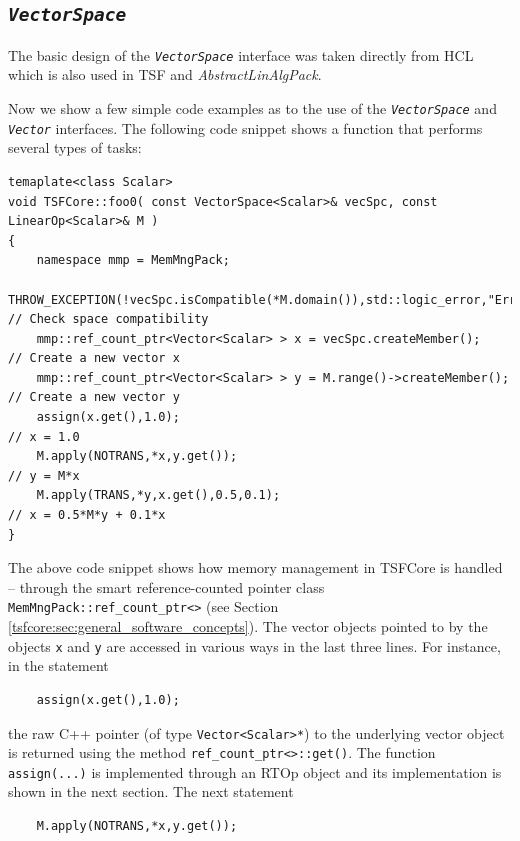 %
\subsection{\texttt{\textit{VectorSpace}}}
\label{tsfcore:sec:vec_space}
%

The basic design of the \texttt{\textit{VectorSpace}} interface was
taken directly from HCL which is also used in TSF and
\textit{AbstractLinAlgPack}.

Now we show a few simple code examples as to the use of the
\texttt{\textit{VectorSpace}} and
\texttt{\textit{Vector}} interfaces.  The following code snippet shows
a function that performs several types of tasks:

{\tiny\begin{verbatim}
temaplate<class Scalar>
void TSFCore::foo0( const VectorSpace<Scalar>& vecSpc, const LinearOp<Scalar>& M )
{
    namespace mmp = MemMngPack;
    THROW_EXCEPTION(!vecSpc.isCompatible(*M.domain()),std::logic_error,"Error!"); // Check space compatibility
    mmp::ref_count_ptr<Vector<Scalar> > x = vecSpc.createMember();                // Create a new vector x
    mmp::ref_count_ptr<Vector<Scalar> > y = M.range()->createMember();            // Create a new vector y
    assign(x.get(),1.0);                                                          // x = 1.0
    M.apply(NOTRANS,*x,y.get());                                                  // y = M*x
    M.apply(TRANS,*y,x.get(),0.5,0.1);                                            // x = 0.5*M*y + 0.1*x
}
\end{verbatim}}

The above code snippet shows how memory management in TSFCore is handled
-- through the smart reference-counted pointer class
\texttt{MemMngPack\-::ref\_count\_ptr<>} (see Section
\ref{tsfcore:sec:general_software_concepts}).  The vector objects pointed
to by the objects \texttt{x} and \texttt{y} are accessed in various
ways in the last three lines.  For instance, in the statement

{\tiny\begin{verbatim}
    assign(x.get(),1.0);
\end{verbatim}}

the raw C++ pointer (of type \texttt{Vector<Scalar>*}) to the
underlying vector object is returned using the method
\texttt{ref\_count\_ptr<>\-::get()}.  The function
\texttt{assign(...)} is implemented through an RTOp object and its
implementation is shown in the next section.  The next statement

{\tiny\begin{verbatim}
    M.apply(NOTRANS,*x,y.get());
\end{verbatim}}

